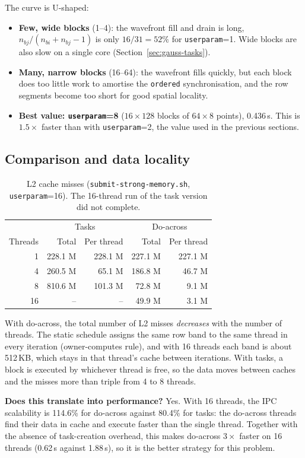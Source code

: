 \documentclass[11pt,a4paper]{article}
\begin{document}
The curve is U-shaped:
\begin{itemize}
  \item \textbf{Few, wide blocks} (1--4): the wavefront fill and drain is long, $n_{bj}/(n_{bi}+n_{bj}-1)$ is only $16/31 = 52\%$ for \texttt{userparam}=1. Wide blocks are also slow on a single core (Section~\ref{sec:gauss-tasks}).
  \item \textbf{Many, narrow blocks} (16--64): the wavefront fills quickly, but each block does too little work to amortise the \texttt{ordered} synchronisation, and the row segments become too short for good spatial locality.
  \item \textbf{Best value: \texttt{userparam}=8} ($16\times128$ blocks of $64\times8$ points), 0.436\,s. This is $1.5\times$ faster than with \texttt{userparam}=2, the value used in the previous sections.
\end{itemize}

\subsection{Comparison and data locality}

\begin{table}[H]
\centering
\begin{tabular}{rrrrr}
\toprule
 & \multicolumn{2}{c}{Tasks} & \multicolumn{2}{c}{Do-across} \\
Threads & Total & Per thread & Total & Per thread \\
\midrule
1  & 228.1 M & 228.1 M & 227.1 M & 227.1 M \\
4  & 260.5 M & 65.1 M  & 186.8 M & 46.7 M \\
8  & 810.6 M & 101.3 M & 72.8 M  & 9.1 M \\
16 & --      & --      & 49.9 M  & 3.1 M \\
\bottomrule
\end{tabular}
\caption{L2 cache misses (\texttt{submit-strong-memory.sh}, \texttt{userparam}=16). The 16-thread run of the task version did not complete.}
\label{tab:l2}
\end{table}

With do-across, the total number of L2 misses \emph{decreases} with the number of threads. The static schedule assigns the same row band to the same thread in every iteration (owner-computes rule), and with 16 threads each band is about 512\,KB, which stays in that thread's cache between iterations. With tasks, a block is executed by whichever thread is free, so the data moves between caches and the misses more than triple from 4 to 8 threads.

\textbf{Does this translate into performance?} Yes. With 16 threads, the IPC scalability is 114.6\% for do-across against 80.4\% for tasks: the do-across threads find their data in cache and execute faster than the single thread. Together with the absence of task-creation overhead, this makes do-across $3\times$ faster on 16 threads (0.62\,s against 1.88\,s), so it is the better strategy for this problem.
\end{document}
